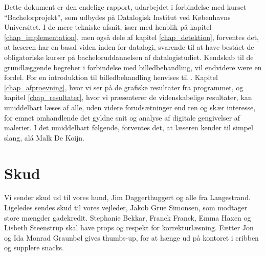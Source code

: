 {
{\sffamily Dette dokument er den endelige rapport, udarbejdet i
forbindelse med kurset ``Bachelorprojekt'', som udbydes på Datalogisk
Institut ved Københavns Universitet. I de mere tekniske afsnit, især med
henblik på kapitel \ref{chap_implementation}, men også dele af kapitel
\ref{chap_detektion}, forventes det, at læseren har en basal viden inden
for datalogi, svarende til at have bestået de obligatoriske kurser på
bacheloruddannelsen af datalogistudiet\cite{DIKUkurser}. Kendskab til de
grundlæggende begreber i forbindelse med billedbehandling, vil endvidere
være en fordel. For en introduktion til billedbehandling henvises til
\cite{SIOlsen}. Kapitel \ref{chap_afproevning}, hvor vi ser på de
grafiske resultater fra programmet, og kapitel \ref{chap_resultater},
hvor vi præsenterer de videnskabelige resultater, kan umiddelbart læses
af alle, uden videre forudsætninger end ren og skær interesse, for emnet
omhandlende det gyldne snit og analyse af digitale gengivelser af
malerier. I det umiddelbart følgende, forventes det, at læseren kender
til simpel slang, alá Malk De Koijn.

\section*{Skud}
Vi sender skud ud til vores hund, Jim Daggerthuggert og alle fra
Langestrand. Ligeledes sendes skud til vores vejleder, Jakob Grue
Simonsen, som modtager store mængder gadekredit. Stephanie Bekkar,
Franck Franck, Emma Haxen og Lisbeth Steenstrup skal have props
og respekt for korrekturlæsning. Fætter Jon og Ida Monrad Graunbøl gives
thumbs-up, for at hænge ud på kontoret i cribben og supplere snacks.

}
}

